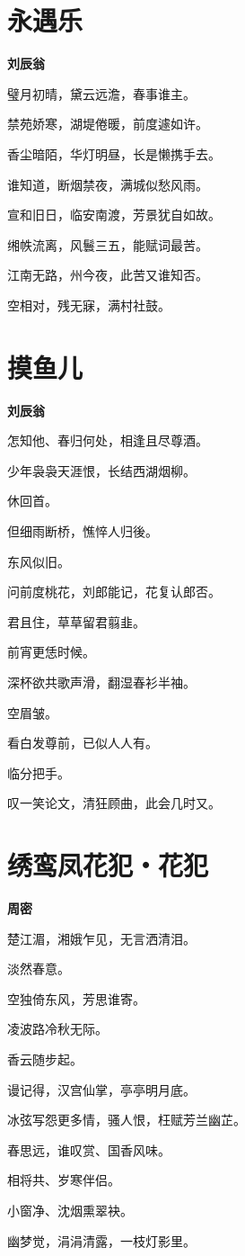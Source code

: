\documentclass[12pt,a4paper]{ctexbook}
\begin{document}
\section{永遇乐}
\textbf{刘辰翁}\par\vspace{0.5em}
璧月初晴，黛云远澹，春事谁主。\par
禁苑娇寒，湖堤倦暖，前度遽如许。\par
香尘暗陌，华灯明昼，长是懒携手去。\par
谁知道，断烟禁夜，满城似愁风雨。\par
宣和旧日，临安南渡，芳景犹自如故。\par
缃帙流离，风鬟三五，能赋词最苦。\par
江南无路，州今夜，此苦又谁知否。\par
空相对，残无寐，满村社鼓。\par

\section{摸鱼儿}
\textbf{刘辰翁}\par\vspace{0.5em}
怎知他、春归何处，相逢且尽尊酒。\par
少年袅袅天涯恨，长结西湖烟柳。\par
休回首。\par
但细雨断桥，憔悴人归後。\par
东风似旧。\par
问前度桃花，刘郎能记，花复认郎否。\par
君且住，草草留君翦韭。\par
前宵更恁时候。\par
深杯欲共歌声滑，翻湿春衫半袖。\par
空眉皱。\par
看白发尊前，已似人人有。\par
临分把手。\par
叹一笑论文，清狂顾曲，此会几时又。\par

\section{绣鸾凤花犯・花犯}
\textbf{周密}\par\vspace{0.5em}
楚江湄，湘娥乍见，无言洒清泪。\par
淡然春意。\par
空独倚东风，芳思谁寄。\par
凌波路冷秋无际。\par
香云随步起。\par
谩记得，汉宫仙掌，亭亭明月底。\par
冰弦写怨更多情，骚人恨，枉赋芳兰幽芷。\par
春思远，谁叹赏、国香风味。\par
相将共、岁寒伴侣。\par
小窗净、沈烟熏翠袂。\par
幽梦觉，涓涓清露，一枝灯影里。\par
\end{document}
